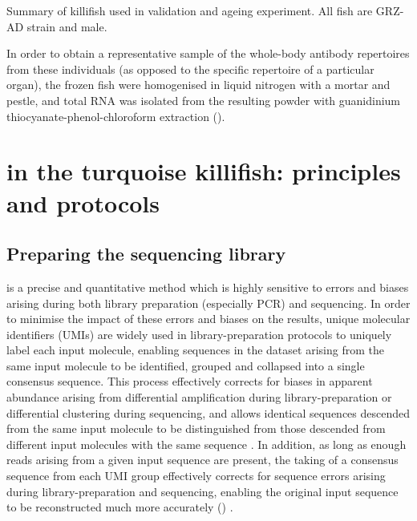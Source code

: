 \begin{table}[b]
\caption{Summary of killifish used in \igseq validation and ageing experiment. All fish are GRZ-AD strain and male.}
\label{tab:igseq-cohorts-summary}

\end{table}

In order to obtain a representative sample of the whole-body antibody repertoires from these individuals (as opposed to the specific repertoire of a particular organ), the frozen fish were homogenised in liquid nitrogen with a mortar and pestle, and total RNA was isolated from the resulting powder with guanidinium thiocyanate-phenol-chloroform extraction ().

\section{\igseq in the turquoise killifish: principles and protocols}
\label{sec:igseq_protocol}

\subsection{Preparing the sequencing library}
\label{sec:igseq_protocol_library}

\IGSEQ is a precise and quantitative method which is highly sensitive to errors and biases arising during both library preparation (especially PCR) and sequencing. In order to minimise the impact of these errors and biases on the results, unique molecular identifiers (UMIs) are widely used in \igseq library-preparation protocols \parencite{vollmers2013consensus,turchaninova2016igprep} to uniquely label each input molecule, enabling sequences in the dataset arising from the same input molecule to be identified, grouped and collapsed into a single consensus sequence. This process effectively corrects for biases in apparent abundance arising from differential amplification during library-preparation or differential clustering during sequencing, and allows identical sequences descended from the same input molecule to be distinguished from those descended from different input molecules with the same sequence \parencite{vollmers2013consensus}. In addition, as long as enough reads arising from a given input sequence are present, the taking of a consensus sequence from each UMI group effectively corrects for sequence errors arising during library-preparation and sequencing, enabling the original input sequence to be reconstructed much more accurately () \parencite{vollmers2013consensus,turchaninova2016igprep}.

